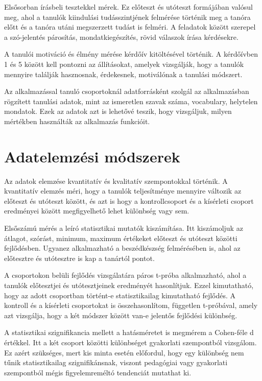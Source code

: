 Elsősorban írásbeli tesztekkel mérek. Ez előteszt és utóteszt formájában valósul meg, \cite{campbell1963experimental} ahol a tanulók kiindulási tudásszintjének felmérése történik meg a tanóra előtt és a tanóra utáni megszerzett tudást is felméri. A feladatok között szerepel a szó-jelentés párosítás, mondatkiegészítés, rövid válaszok írása kérdésekre. 

A tanulói motiváció és élmény mérése kérdőív kitöltésével történik. A kérdőívben 1 és 5 között kell pontozni az állításokat, amelyek vizsgálják, hogy a tanulók mennyire találják hasznosnak, érdekesnek, motiválónak a tanulási módszert.

Az alkalmazással tanuló csoportoknál adatforrásként szolgál az alkalmazásban rögzített tanulási adatok, mint az ismeretlen szavak száma, vocabulary, helytelen mondatok. Ezek az adatok azt is lehetővé teszik, hogy vizsgáljuk, milyen mértékben használták az alkalmazás funkcióit.

\section{Adatelemzési módszerek}
Az adatok elemzése kvantitatív és kvalitatív szempontokkal történik. A kvantitatív elemzés méri, hogy a tanulók teljesítménye mennyire változik az előteszt és utóteszt között, és azt is hogy a kontrollcsoport és a kísérleti csoport eredményei között megfigyelhető lehet különbség vagy sem.

Elsőszámú mérés a leíró statisztikai mutatók kiszámítása. Itt kiszámoljuk az átlagot, szórást, minimum, maximum értékeket előteszt és utóteszt közötti fejlődésben. Ugyanez alkalmazható a beszédkészség felmérésében is, ahol az előtesztre és utótesztre is kap a tanártól pontot.

A csoportokon belüli fejlődés vizsgálatára páros t-próba alkalmazható, \cite{field2013statistics} ahol a tanulók előtesztjei és utótesztjeinek eredményét hasonlítjuk. Ezzel kimutatható, hogy az adott csoportban történt-e statisztikailag kimutatható fejlődés. A kontroll és a kísérleti csoportokat is összehasonlítom, független t-próbával, amely azt vizsgálja, hogy a két módszer között van-e jelentős fejlődési különbség.

A statisztikai szignifikancia mellett a hatásméretet is megmérem a Cohen-féle d értékkel. \cite{cohen1988statistical} Itt a két csoport közötti különbséget gyakorlati szempontból vizsgálom. Ez azért szükséges, mert kis minta esetén előfordul, hogy egy különbség nem tűnik statisztikailag szignifikánsnak, viszont pedagógiai vagy gyakorlati szempontból mégis figyelemreméltó tendenciát mutathat ki.

